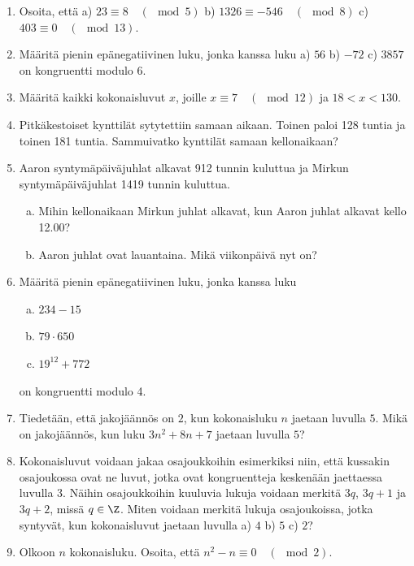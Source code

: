 \begin{enumerate}

\item
Osoita, että a) $23 \equiv 8 \quad (\mod 5)$ b) $1326 \equiv -546\quad (\mod 8)$ c) $403 \equiv 0 \quad (\mod 13)$.

\item
Määritä pienin epänegatiivinen luku, jonka kanssa luku a) $56$ b) $-72$ c) $3857$ on kongruentti modulo $6$.

\item
Määritä kaikki kokonaisluvut $x$, joille $x \equiv 7 \quad (\mod 12)$ ja $18 < x < 130$.

\item
Pitkäkestoiset kynttilät sytytettiin samaan aikaan. Toinen paloi 128 tuntia ja toinen 181 tuntia. Sammuivatko kynttilät samaan kellonaikaan?

\item Aaron syntymäpäiväjuhlat alkavat 912 tunnin kuluttua ja Mirkun syntymäpäiväjuhlat 1419 tunnin kuluttua.
\begin{enumerate}[a)]
\item Mihin kellonaikaan Mirkun juhlat alkavat, kun Aaron juhlat alkavat kello 12.00?
\item Aaron juhlat ovat lauantaina. Mikä viikonpäivä nyt on?
\end{enumerate}

\item Määritä pienin epänegatiivinen luku, jonka kanssa luku
\begin{enumerate}[a)]
\item $234 - 15$
\item $79 \cdot 650$
\item $19^{12} + 772$
\end{enumerate}
on kongruentti modulo 4.

\item
Tiedetään, että jakojäännös on $2$, kun kokonaisluku $n$ jaetaan luvulla $5$. Mikä on jakojäännös, kun luku $3n^2 + 8n + 7$ jaetaan luvulla $5$?

\item Kokonaisluvut voidaan jakaa osajoukkoihin esimerkiksi niin, että kussakin osajoukossa ovat ne luvut, jotka ovat kongruentteja keskenään jaettaessa luvulla 3. Näihin osajoukkoihin kuuluvia lukuja voidaan merkitä $3q$, $3q + 1$ ja $3q + 2$, missä $q \in \Z$. Miten voidaan merkitä lukuja osajoukoissa, jotka syntyvät, kun kokonaisluvut jaetaan luvulla a) $4$ b) $5$ c) $2$?

\item Olkoon $n$ kokonaisluku. Osoita, että $n^2 - n \equiv 0\quad (\mod 2)$.


\end{enumerate}

